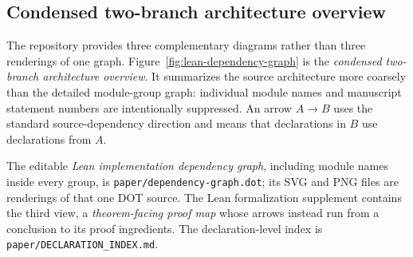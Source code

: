 \subsection{Condensed two-branch architecture overview}
\label{app:lean-dependency-graph}

The repository provides three complementary diagrams rather than three
renderings of one graph. Figure~\ref{fig:lean-dependency-graph} is the
\emph{condensed two-branch architecture overview}. It summarizes the source
architecture more coarsely than the detailed module-group graph: individual
module names and manuscript statement numbers are intentionally suppressed.
An arrow \(A\to B\) uses the standard source-dependency direction and means
that declarations in \(B\) use declarations from \(A\).

The editable \emph{Lean implementation dependency graph}, including module
names inside every group, is \texttt{paper/dependency-graph.dot}; its SVG and
PNG files are renderings of that one DOT source. The Lean formalization supplement
contains the third view, a \emph{theorem-facing proof map} whose arrows instead
run from a conclusion to its proof ingredients. The declaration-level index is
\texttt{paper/DECLARATION\_INDEX.md}.

